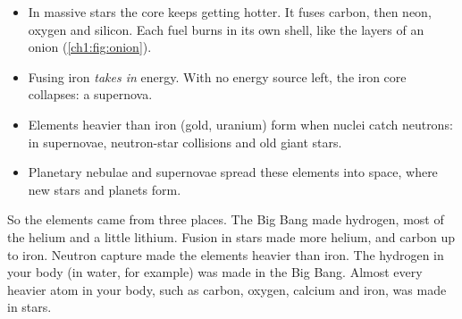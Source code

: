 \begin{sidebyside}[0.3]
  \centering
  \label{ch1:fig:onion}
\nextside
  \begin{itemize}
    \item In massive stars the core keeps getting hotter. It fuses carbon, then neon,
          oxygen and silicon. Each fuel burns in its own shell, like the layers of an
          onion (\cref{ch1:fig:onion}).
    \item Fusing iron \emph{takes in} energy. With no energy source left, the iron core
          collapses: a supernova.
    \item Elements heavier than iron (gold, uranium) form when nuclei catch neutrons:
          in supernovae, neutron-star collisions and old giant stars.
    \item Planetary nebulae and supernovae spread these elements into space, where new
          stars and planets form.
  \end{itemize}
\end{sidebyside}

So the elements came from three places. The Big Bang made hydrogen, most of the helium
and a little lithium. Fusion in stars made more helium, and carbon up to iron. Neutron
capture made the elements heavier than iron. The hydrogen in your body (in water, for
example) was made in the Big Bang. Almost every heavier atom in your body, such as
carbon, oxygen, calcium and iron, was made in stars.

